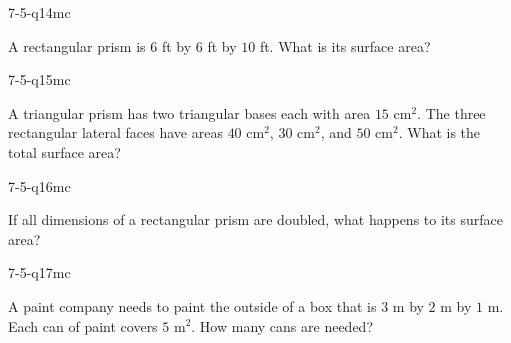 \begin{practiceQuestion}{7-5-q14}{mc}
\begin{questionText}
A rectangular prism is $6$ ft by $6$ ft by $10$ ft. What is its surface area?
\end{questionText}
\end{practiceQuestion}

\begin{practiceQuestion}{7-5-q15}{mc}
\begin{questionText}
A triangular prism has two triangular bases each with area $15$ cm$^2$. The three rectangular lateral faces have areas $40$ cm$^2$, $30$ cm$^2$, and $50$ cm$^2$. What is the total surface area?
\end{questionText}
\end{practiceQuestion}

\begin{practiceQuestion}{7-5-q16}{mc}
\begin{questionText}
If all dimensions of a rectangular prism are doubled, what happens to its surface area?
\end{questionText}
\end{practiceQuestion}

\begin{practiceQuestion}{7-5-q17}{mc}
\begin{questionText}
A paint company needs to paint the outside of a box that is $3$ m by $2$ m by $1$ m. Each can of paint covers $5$ m$^2$. How many cans are needed?
\end{questionText}
\end{practiceQuestion}

